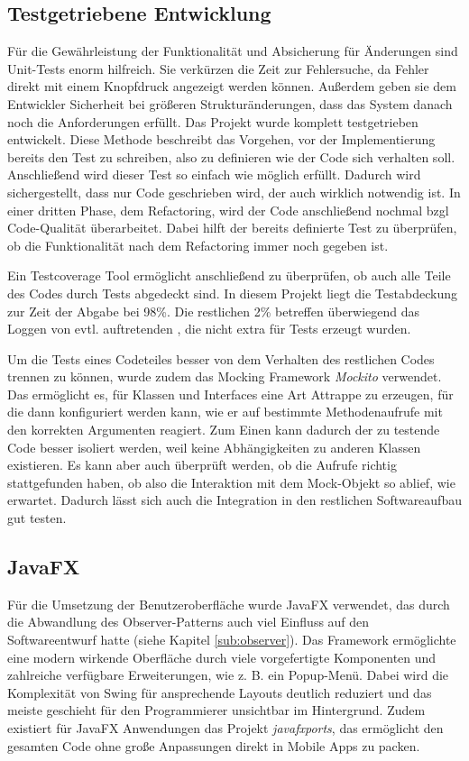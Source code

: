 \subsection{Testgetriebene Entwicklung} %
\label{sub:testgetriebene_entwicklung}

Für die Gewährleistung der Funktionalität und Absicherung für Änderungen sind Unit-Tests enorm hilfreich. Sie verkürzen die Zeit zur Fehlersuche, da Fehler direkt mit einem Knopfdruck angezeigt werden können. Außerdem geben sie dem Entwickler Sicherheit bei größeren Strukturänderungen, dass das System danach noch die Anforderungen erfüllt. Das Projekt wurde komplett testgetrieben entwickelt. Diese Methode beschreibt das Vorgehen, vor der Implementierung bereits den Test zu schreiben, also zu definieren wie der Code sich verhalten soll. Anschließend wird dieser Test so einfach wie möglich erfüllt. Dadurch wird sichergestellt, dass nur Code geschrieben wird, der auch wirklich notwendig ist. In einer dritten Phase, dem Refactoring, wird der Code anschließend nochmal bzgl Code-Qualität überarbeitet. Dabei hilft der bereits definierte Test zu überprüfen, ob die Funktionalität nach dem Refactoring immer noch gegeben ist. 

Ein Testcoverage Tool ermöglicht anschließend zu überprüfen, ob auch alle Teile des Codes durch Tests abgedeckt sind. In diesem Projekt liegt die Testabdeckung zur Zeit der Abgabe bei 98\%. Die restlichen 2\% betreffen überwiegend das Loggen von evtl. auftretenden , die nicht extra für Tests erzeugt wurden.

Um die Tests eines Codeteiles besser von dem Verhalten des restlichen Codes trennen zu können, wurde zudem das Mocking Framework \emph{Mockito} verwendet. Das ermöglicht es, für Klassen und Interfaces eine Art Attrappe zu erzeugen, für die dann konfiguriert werden kann, wie er auf bestimmte Methodenaufrufe mit den korrekten Argumenten reagiert. Zum Einen kann dadurch der zu testende Code besser isoliert werden, weil keine Abhängigkeiten zu anderen Klassen existieren. Es kann aber auch überprüft werden, ob die Aufrufe richtig stattgefunden haben, ob also die Interaktion mit dem Mock-Objekt so ablief, wie erwartet. Dadurch lässt sich auch die Integration in den restlichen Softwareaufbau gut testen.


\subsection{JavaFX} %
\label{sub:javafx}
Für die Umsetzung der Benutzeroberfläche wurde JavaFX verwendet, das durch die Abwandlung des Observer-Patterns auch viel Einfluss auf den Softwareentwurf hatte (siehe Kapitel \ref{sub:observer}). Das Framework ermöglichte eine modern wirkende Oberfläche durch viele vorgefertigte Komponenten und zahlreiche verfügbare Erweiterungen, wie z. B. ein Popup-Menü. Dabei wird die Komplexität von Swing für ansprechende Layouts deutlich reduziert und das meiste geschieht für den Programmierer unsichtbar im Hintergrund. Zudem existiert für JavaFX Anwendungen das Projekt \emph{javafxports}, das ermöglicht den gesamten Code ohne große Anpassungen direkt in Mobile Apps zu packen.

